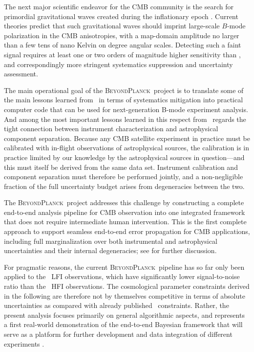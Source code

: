 \documentclass[onecolumn]{aa}
\newcommand{\BP}{\textsc{BeyondPlanck}}
\begin{document}
The next major scientific endeavor for the CMB community is the
search for primordial gravitational waves created during the
inflationary epoch \citep[e.g.,][]{kamionkowski:2016}. Current theories predict that such gravitational
waves should imprint large-scale $B$-mode polarization in the CMB
anisotropies, with a map-domain amplitude no larger than a few tens of
nano Kelvin on degree angular scales. Detecting such a faint signal
requires at least one or two orders of magnitude higher sensitivity
than \Planck, and correspondingly more stringent systematics
suppression and uncertainty assessment.

The main operational goal of the \BP\ project \citep{bp01} is to
translate some of the main lessons learned from \Planck\ in terms of
systematics mitigation into practical computer code that can be used
for next-generation B-mode experiment analysis. And among the most
important lessons learned in this respect from \Planck\ regards the
tight connection between instrument characterization and astrophysical
component separation. Because any CMB satellite experiment in practice
must be calibrated with in-flight observations of astrophysical
sources, the calibration is in practice limited by our knowledge by
the astrophysical sources in question---and this must itself be
derived from the same data set. Instrument calibration and component
separation must therefore be performed jointly, and a non-negligible
fraction of the full uncertainty budget arises from degeneracies
between the two.

The \BP\ project addresses this challenge by constructing a complete
end-to-end analysis pipeline for CMB observation into one integrated
framework that does not require intermediate human intervention. This
is the first complete approach to support seamless end-to-end error
propagation for CMB applications, including full marginalization over
both instrumental and astrophysical uncertainties and their
internal degeneracies; see \citet{bp01,bp11} for further discussion.

For pragmatic reasons, the current \BP\ pipeline has so far only been
applied to the \Planck\ LFI observations, which have significantly
lower signal-to-noise ratio than the \Planck\ HFI observations. The
cosmological parameter constraints derived in the following are
therefore not by themselves competitive in terms of absolute
uncertainties as compared with already published
\Planck\ constraints. Rather, the present analysis focuses primarily
on general algorithmic aspects, and represents a first real-world
demonstration of the end-to-end Bayesian framework that will serve as
a platform for further development and data integration of different
experiments \citep{bp05}.
\end{document}

